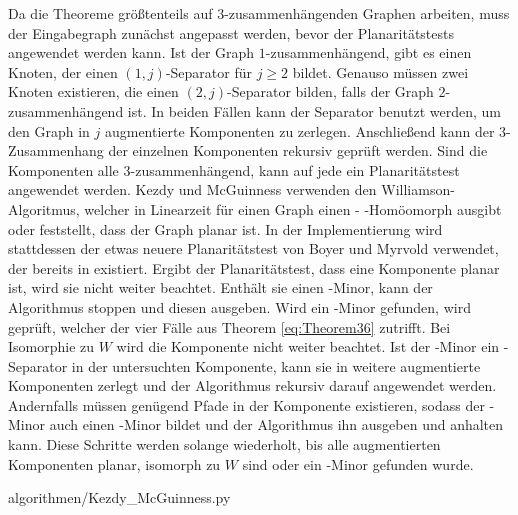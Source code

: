 Da die Theoreme größtenteils auf $3$-zusammenhängenden Graphen arbeiten, muss der Eingabegraph \ggf zunächst angepasst werden, bevor der Planaritätstests angewendet werden kann.
Ist der Graph $1$-zusammenhängend, gibt es einen Knoten, der einen $(1, j)$-Separator für $j \geq 2$ bildet.
Genauso müssen zwei Knoten existieren, die einen $(2, j)$-Separator bilden, falls der Graph $2$-zusammenhängend ist.
In beiden Fällen kann der Separator benutzt werden, um den Graph in $j$ augmentierte Komponenten zu zerlegen.
Anschließend kann der $3$-Zusammenhang der einzelnen Komponenten rekursiv geprüft werden.
Sind die Komponenten alle $3$-zusammenhängend, kann auf jede ein Planaritätstest angewendet werden.
Kezdy und McGuinness verwenden den Williamson-Algoritmus,\cite{Wil84} welcher in Linearzeit für einen Graph einen \kf- \bzw \kdd-Homöomorph ausgibt oder feststellt, dass der Graph planar ist.
In der Implementierung wird stattdessen der etwas neuere Planaritätstest von Boyer und Myrvold\cite{BoM04} verwendet, der bereits in \OGDF existiert.
Ergibt der Planaritätstest, dass eine Komponente planar ist, wird sie nicht weiter beachtet.
Enthält sie einen \kf-Minor, kann der Algorithmus stoppen und diesen ausgeben.
Wird ein \kdd-Minor gefunden, wird geprüft, welcher der vier Fälle aus Theorem \ref{eq:Theorem36} zutrifft.
Bei Isomorphie zu $W$ wird die Komponente nicht weiter beachtet.
Ist der \kdd-Minor ein \dd-Separator in der untersuchten Komponente, kann sie in weitere augmentierte Komponenten zerlegt und der Algorithmus rekursiv darauf angewendet werden.
Andernfalls müssen genügend Pfade in der Komponente existieren, sodass der \kdd-Minor auch einen \kf-Minor bildet und der Algorithmus ihn ausgeben und anhalten kann.
Diese Schritte werden solange wiederholt, bis alle augmentierten Komponenten planar, isomorph zu $W$ sind oder ein \kf-Minor gefunden wurde.

\newpage
\begin{minipage}{\linewidth}

                {algorithmen/Kezdy_McGuinness.py}
\end{minipage}
